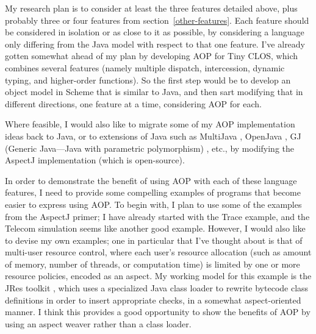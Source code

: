 \documentclass[12pt]{article}
\begin{document}
My research plan is to consider at least the three features detailed
above, plus probably three or four features from
section~\ref{other-features}.  Each feature should be considered in
isolation or as close to it as possible, by considering a language
only differing from the Java model with respect to that one feature.
I've already gotten somewhat ahead of my plan by developing AOP for
Tiny CLOS, which combines several features (namely multiple dispatch, 
intercession, dynamic typing, and higher-order functions).  So the
first step would be to develop an object model in Scheme that is
similar to Java, and then sart modifying that in different directions, 
one feature at a time, considering AOP for each.

Where feasible, I would also like to migrate some of my AOP
implementation ideas back to Java, or to extensions of Java such as
MultiJava \cite{MultiJava}, OpenJava \cite{OpenJava}, GJ (Generic
Java---Java with parametric polymorphism) \cite{GJ}, etc., by
modifying the AspectJ implementation (which is open-source).

In order to demonstrate the benefit of using AOP with each of these
language features, I need to provide some compelling examples of
programs that become easier to express using AOP.  To begin with, I
plan to use some of the examples from the AspectJ primer; I have
already started with the Trace example, and the Telecom simulation
seems like another good example.  However, I would also like to devise 
my own examples; one in particular that I've thought about is that of
multi-user resource control, where each user's resource allocation (such
as amount of memory, number of threads, or computation time) is
limited by one or more resource policies, encoded as an aspect.  My
working model for this example is the JRes toolkit \cite{JRes}, which
uses a specialized Java class loader to rewrite bytecode class
definitions in order to insert appropriate checks, in a somewhat
aspect-oriented manner.  I think this provides a good opportunity to
show the benefits of AOP by using an aspect weaver rather than a class 
loader.



\end{document}

